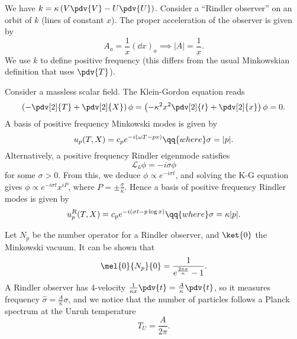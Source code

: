 \documentclass{jknotes}
\begin{document}
We have \(k=\kappa\left(V\pdv{V}-U\pdv{U}\right)\). Consider a ``Rindler observer'' on an orbit of \(k\) (lines of constant \(x\)). The proper acceleration of the observer is given by
\begin{equation}
    A_a = \frac{1}{x}(\dd{x})_a \implies |A| = \frac{1}{x}.
\end{equation}
We use \(k\) to define positive frequency (this differs from the usual Minkowskian definition that uses \(\pdv{T}\)).

Consider a massless scalar field. The Klein-Gordon equation reads
\begin{equation}
    \left(-\pdv[2]{T} + \pdv[2]{X}\right)\phi = \left(-\kappa^2x^2\pdv[2]{t} + \pdv[2]{x}\right)\phi = 0.
\end{equation}
A basis of positive frequency Minkowski modes is given by
\begin{equation}
    u_p(T,X) = c_pe^{-i(\omega T - px)} \qq{where} \sigma = |p|.
\end{equation}
Alternatively, a positive frequency Rindler eigenmode satisfies
\begin{equation}
    \mathcal{L}_k\phi = -i\sigma\phi
\end{equation}
for some \(\sigma>0\). From this, we deduce \(\phi \propto e^{-i\sigma t}\), and solving the K-G equation gives \(\phi \propto e^{-i\sigma t} x^{iP}\), where \(P = \pm \frac{\sigma}{\kappa}\). Hence a basis of positive frequency Rindler modes is given by
\begin{equation}
    u_p^R(T,X) = c_pe^{-i(\sigma t - p \log x)} \qq{where} \sigma = \kappa |p|.
\end{equation}

Let \(N_p\) be the number operator for a Rindler observer, and \(\ket{0}\) the Minkowski vacuum. It can be shown that
\begin{equation}
    \mel{0}{N_p}{0} = \frac{1}{e^{\frac{2\pi\sigma}{\kappa}}-1}.
\end{equation}
A Rindler observer has 4-velocity \(\frac{1}{\kappa x}\pdv{t}=\frac{A}{\kappa}\pdv{t}\), so it measures frequency \(\hat{\sigma} = \frac{A}{\kappa}\sigma\), and we notice that the number of particles follows a Planck spectrum at the Unruh temperature
\begin{equation}
    T_U = \frac{A}{2\pi}.
\end{equation}
\end{document}
